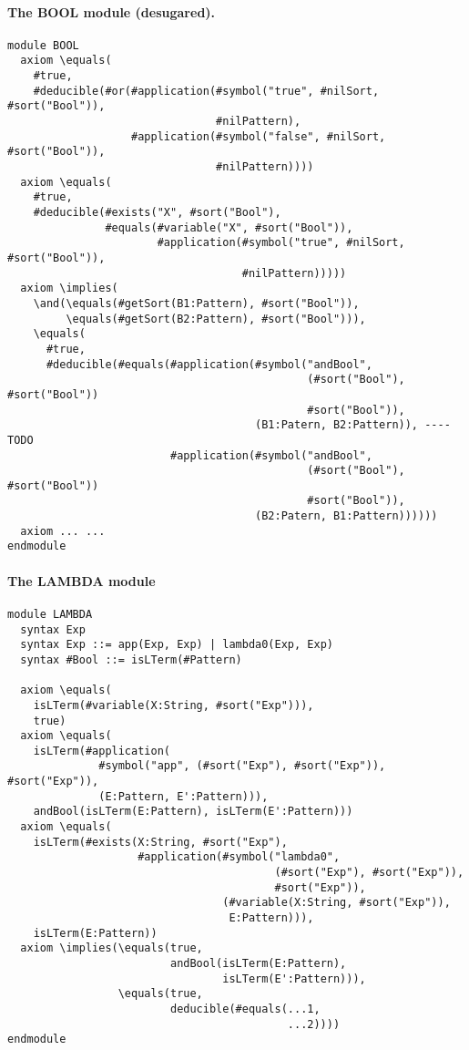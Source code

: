 \documentclass[UTF8]{article}
\theoremstyle{plain}
\theoremstyle{definition}
\theoremstyle{remark}
\begin{document}
\paragraph{The {\small BOOL} module (desugared).}\quad
\begin{Verbatim}[fontsize=\small]
module BOOL
  axiom \equals(
    #true,
    #deducible(#or(#application(#symbol("true", #nilSort, #sort("Bool")),
                                #nilPattern), 
                   #application(#symbol("false", #nilSort, #sort("Bool")),
                                #nilPattern))))
  axiom \equals(
    #true,
    #deducible(#exists("X", #sort("Bool"), 
               #equals(#variable("X", #sort("Bool")), 
                       #application(#symbol("true", #nilSort, #sort("Bool")),
                                    #nilPattern)))))
  axiom \implies(
    \and(\equals(#getSort(B1:Pattern), #sort("Bool")), 
         \equals(#getSort(B2:Pattern), #sort("Bool"))),
    \equals(
      #true,
      #deducible(#equals(#application(#symbol("andBool", 
                                              (#sort("Bool"), #sort("Bool"))
                                              #sort("Bool")), 
                                      (B1:Patern, B2:Pattern)), ---- TODO
                         #application(#symbol("andBool", 
                                              (#sort("Bool"), #sort("Bool"))
                                              #sort("Bool")), 
                                      (B2:Patern, B1:Pattern))))))
  axiom ... ...
endmodule
\end{Verbatim}

\paragraph{The {\small LAMBDA} module}\quad
\begin{Verbatim}[fontsize=\small]
module LAMBDA
  syntax Exp
  syntax Exp ::= app(Exp, Exp) | lambda0(Exp, Exp)
  syntax #Bool ::= isLTerm(#Pattern)

  axiom \equals(
    isLTerm(#variable(X:String, #sort("Exp"))), 
    true)
  axiom \equals(
    isLTerm(#application(
              #symbol("app", (#sort("Exp"), #sort("Exp")), #sort("Exp")),
              (E:Pattern, E':Pattern))),
    andBool(isLTerm(E:Pattern), isLTerm(E':Pattern)))
  axiom \equals(
    isLTerm(#exists(X:String, #sort("Exp"),
                    #application(#symbol("lambda0",
                                         (#sort("Exp"), #sort("Exp")),
                                         #sort("Exp")),
                                 (#variable(X:String, #sort("Exp")),
                                  E:Pattern))),
    isLTerm(E:Pattern))
  axiom \implies(\equals(true, 
                         andBool(isLTerm(E:Pattern), 
                                 isLTerm(E':Pattern))),
                 \equals(true,
                         deducible(#equals(...1,
                                           ...2)))) 
endmodule
\end{Verbatim}
\end{document}
